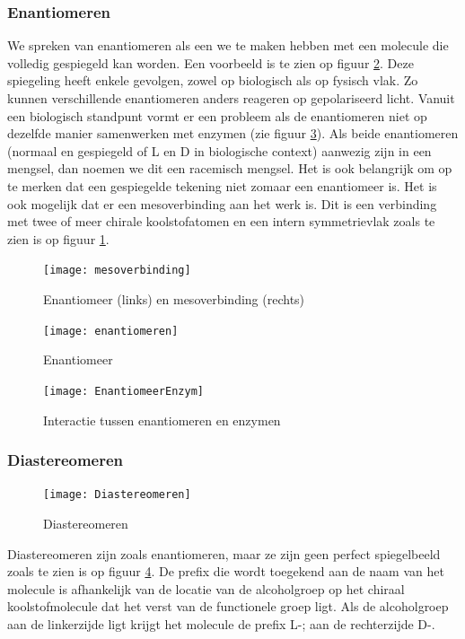 \documentclass[a4paper,kul]{kulakarticle} %
\begin{document}
\subsubsection{Enantiomeren}
\label{sec:enantiomeren}
We spreken van enantiomeren als een we te maken hebben met een molecule die volledig gespiegeld kan worden. Een voorbeeld is te zien op figuur \ref{fig:enantiomeren}. Deze spiegeling heeft enkele gevolgen, zowel op biologisch als op fysisch vlak. Zo kunnen verschillende enantiomeren anders reageren op gepolariseerd licht. Vanuit een biologisch standpunt vormt er een probleem als de enantiomeren niet op dezelfde manier samenwerken met enzymen (zie figuur \ref{fig:enantiomeerenzym}). Als beide enantiomeren (normaal en gespiegeld of L en D in biologische context) aanwezig zijn in een mengsel, dan noemen we dit een racemisch mengsel.
Het is ook belangrijk om op te merken dat een gespiegelde tekening niet zomaar een enantiomeer is. Het is ook mogelijk dat er een mesoverbinding aan het werk is. Dit is een verbinding met twee of meer chirale koolstofatomen en een intern symmetrievlak zoals te zien is op figuur \ref{fig:mesoverbinding}. 
\begin{figure}
	\centering
	\texttt{[image: mesoverbinding]}
	\caption[Mesoverbinding]{Enantiomeer (links) en mesoverbinding (rechts)}
	\label{fig:mesoverbinding}
\end{figure}

\begin{figure}[htbp]
	\centering
	\texttt{[image: enantiomeren]}
	\caption[Enantiomeer]{Enantiomeer}
	\label{fig:enantiomeren}
\end{figure}
\begin{figure}[htbp]
	\centering
	\texttt{[image: EnantiomeerEnzym]}
	\caption[Enantiomeer en enzym]{Interactie tussen enantiomeren en enzymen}
	\label{fig:enantiomeerenzym}
\end{figure}


\subsubsection{Diastereomeren}
\begin{figure}[htbp]
	\centering
	\texttt{[image: Diastereomeren]}
	\caption[Diastereomeren]{Diastereomeren}
	\label{fig:diastereomeren}
\end{figure}
\noindent
Diastereomeren zijn zoals enantiomeren, maar ze zijn geen perfect spiegelbeeld zoals te zien is op figuur \ref{fig:diastereomeren}. De prefix die wordt toegekend aan de naam van het molecule is afhankelijk van de locatie van de alcoholgroep op het chiraal koolstofmolecule dat het verst van de functionele groep ligt. Als de alcoholgroep aan de linkerzijde ligt krijgt het molecule de prefix L-; aan de rechterzijde D-.
\end{document}
